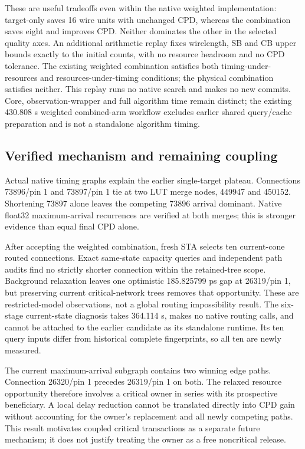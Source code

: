 These are useful tradeoffs even within the native weighted implementation: target-only saves 16 wire units with unchanged CPD, whereas the combination saves eight and improves CPD. Neither dominates the other in the selected quality axes. An additional arithmetic replay fixes wirelength, SB and CB upper bounds exactly to the initial counts, with no resource headroom and no CPD tolerance. The existing weighted combination satisfies both timing-under-resources and resources-under-timing conditions; the physical combination satisfies neither. This replay runs no native search and makes no new commits. Core, observation-wrapper and full algorithm time remain distinct; the existing 430.808 s weighted combined-arm workflow excludes earlier shared query/cache preparation and is not a standalone algorithm timing.

\subsection{Verified mechanism and remaining coupling}
Actual native timing graphs explain the earlier single-target plateau. Connections 73896/pin 1 and 73897/pin 1 tie at two LUT merge nodes, 449947 and 450152. Shortening 73897 alone leaves the competing 73896 arrival dominant. Native float32 maximum-arrival recurrences are verified at both merges; this is stronger evidence than equal final CPD alone.

After accepting the weighted combination, fresh STA selects ten current-cone routed connections. Exact same-state capacity queries and independent path audits find no strictly shorter connection within the retained-tree scope. Background relaxation leaves one optimistic 185.825799 ps gap at 26319/pin 1, but preserving current critical-network trees removes that opportunity. These are restricted-model observations, not a global routing impossibility result. The six-stage current-state diagnosis takes 364.114 s, makes no native routing calls, and cannot be attached to the earlier candidate as its standalone runtime. Its ten query inputs differ from historical complete fingerprints, so all ten are newly measured.

The current maximum-arrival subgraph contains two winning edge paths. Connection 26320/pin 1 precedes 26319/pin 1 on both. The relaxed resource opportunity therefore involves a critical owner in series with its prospective beneficiary. A local delay reduction cannot be translated directly into CPD gain without accounting for the owner's replacement and all newly competing paths. This result motivates coupled critical transactions as a separate future mechanism; it does not justify treating the owner as a free noncritical release.

